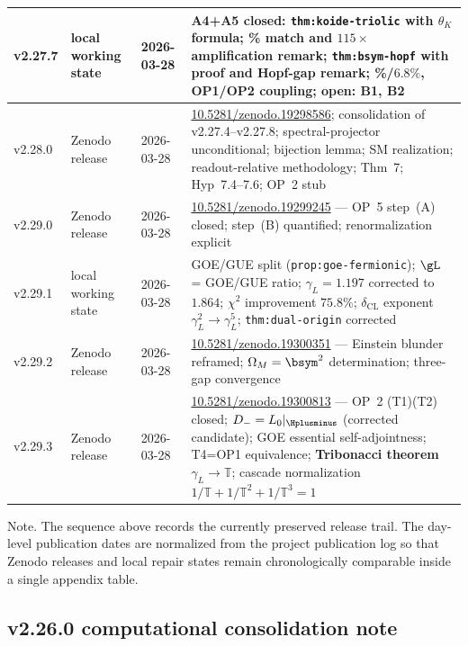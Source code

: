 {\begin{longtable}{|p{}|p{}|p{}|p{}|}
\hline
v2.27.7 & local working state & 2026-03-28 & A4+A5 closed: \texttt{thm:koide-triolic} with $\theta_K$ formula; \newline 0.111\% match and $115\times$ amplification remark; \newline \texttt{thm:bsym-hopf} with proof and Hopf-gap remark; \newline 4.9\%/$6.8\%$, OP1/OP2 coupling; open: B1, B2 \\
\hline
v2.28.0 & Zenodo release & 2026-03-28 & \href{https://doi.org/10.5281/zenodo.19298586}{10.5281/zenodo.19298586}; consolidation of v2.27.4--v2.27.8; spectral-projector unconditional; bijection lemma; SM realization; readout-relative methodology; Thm~7; Hyp~7.4--7.6; OP~2 stub \\
\hline
v2.29.0 & Zenodo release & 2026-03-28 & \href{https://doi.org/10.5281/zenodo.19299245}{10.5281/zenodo.19299245} --- OP~5 step~(A) closed; step~(B) quantified; renormalization explicit \\
\hline
v2.29.1 & local working state & 2026-03-28 & GOE/GUE split (\texttt{prop:goe-fermionic}); $\gL$ = GOE/GUE ratio; $\gamma_L=1.197$ corrected to $1.864$; $\chi^2$ improvement $75.8\%$; $\delta_{\mathrm{CL}}$ exponent $\gamma_L^2\to\gamma_L^5$; \texttt{thm:dual-origin} corrected \\
\hline
v2.29.2 & Zenodo release & 2026-03-28 & \href{https://doi.org/10.5281/zenodo.19300351}{10.5281/zenodo.19300351} --- Einstein blunder reframed; $\Omega_M=\bsym^2$ determination; three-gap convergence \\
\hline
v2.29.3 & Zenodo release & 2026-03-28 & \href{https://doi.org/10.5281/zenodo.19300813}{10.5281/zenodo.19300813} --- OP~2 (T1)(T2) closed; $D_-=L_0|_{\Hplusminus}$ (corrected candidate); GOE essential self-adjointness; T4=OP1 equivalence; \textbf{Tribonacci theorem} $\gamma_L\to\mathbb{T}$; cascade normalization $1/\mathbb{T}+1/\mathbb{T}^2+1/\mathbb{T}^3=1$ \\
\hline
\end{longtable}
}

\noindent Note. The sequence above records the currently preserved release trail.
The day-level publication dates are normalized from the project publication log so that
Zenodo releases and local repair states remain chronologically comparable inside a single
appendix table.


\subsection*{v2.26.0 computational consolidation note}


